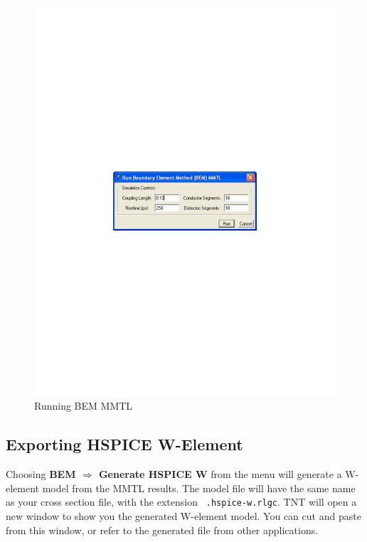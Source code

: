 \documentclass{article}
\begin{document}
\begin{figure}[hbt]
\begin{center}\includegraphics[scale=0.5]{mmtl-run}\end{center}
\caption { Running BEM MMTL }
\label{fig:mmtl-run}
\end{figure}



\subsection {Exporting HSPICE W-Element}

Choosing {\bf BEM $\Rightarrow$ Generate HSPICE W} from the menu will
generate a W-element model from the MMTL results.  The model file will
have the same name as your cross section file, with the extension {\tt
.hspice-w.rlgc}.  TNT will open a new window to show you the generated
W-element model.  You can cut and paste from this window, or refer to
the generated file from other applications.
\end{document}
